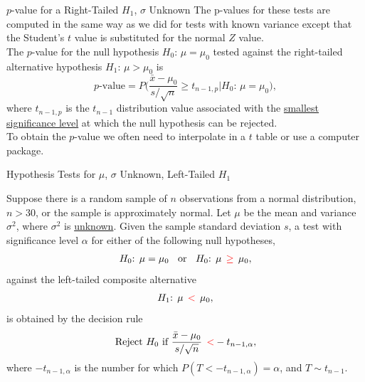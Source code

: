 \documentclass[pdf]{beamer}
\theoremstyle{remark}
\theoremstyle{definition}
\begin{document}
\begin{frame}[t]{$p$-value for a Right-Tailed $H_1$, $\sigma$ Unknown}
The p-values for these tests are computed in the same way as we did for tests with known variance except that the Student's $t$ value is substituted for the normal $Z$ value. \\
\vspace{1.5ex}
The $p$-value for the null hypothesis $H_0\text{: }  \mu = \mu_0$ tested against the right-tailed alternative hypothesis $H_1\text{: }  \mu > \mu_0$ is \\
\vspace{1.5ex}
\begin{equation}
p\text{-value} = P\bigg( \frac{\bar{x} - \mu_0}{s/ \sqrt{n}} \geq t_{n-1,p} | H_0\text{: }  \mu = \mu_0 \bigg),
\end{equation}
where $t_{n-1,p}$ is the $t_{n-1}$ distribution value associated with the \underline{smallest significance level} at which the null hypothesis can be rejected. \\
\vspace{1.5ex}
To obtain the $p$-value we often need to interpolate in a $t$ table or use a computer package.
\end{frame}

\begin{frame}[t]{Hypothesis Tests for $\mu$, $\sigma$ Unknown, Left-Tailed $H_1$}
\small
\begin{tcolorbox}[colback=white!5,colframe=franklinblue]%
Suppose there is a random sample of $n$ observations from a normal distribution, $n > 30$, or the sample is approximately normal.  Let $\mu$ be the mean and variance $\sigma^2$, where $\sigma^2$ is \underline{unknown}. Given the sample standard deviation $s$, a test with significance level $\alpha$ for either of the following null hypotheses, 
\vspace{-1.0ex}
\begin{align*} 
H_0\text{: }  \mu = \mu_0 \;\; \text{ or } \;\; H_0\text{: }  \mu \;\, \textcolor{red}{\geq} \;\, \mu_0, 
\end{align*} 
\vspace{-1.0ex}
against the left-tailed composite alternative 
\vspace{0.0ex}
\begin{align*} 
H_1\text{: }  \mu \;\, \textcolor{red}{<} \;\, \mu_0, 
\end{align*} 
\vspace{-1.0ex}
is obtained by the decision rule 
\vspace{0.0ex}
\begin{equation} 
\text{Reject } H_0 \text{ if } \frac{\bar{x} - \mu_0}{s/ \sqrt{n}} \;\, \textcolor{red}{<}  -t_{n-1,\alpha},
\end{equation} 
where $-t_{n-1,\alpha}$ is the number for which $P(T < -t_{n-1,\alpha}) = \alpha$, and $T \sim t_{n-1}$. 
\end{tcolorbox}
\end{frame}
\end{document}
